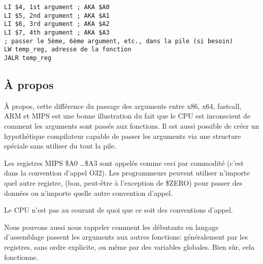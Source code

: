 \begin{lstlisting}[caption=MIPS (O32 calling convention),style=customasmMIPS]
LI $4, 1st argument ; AKA $A0
LI $5, 2nd argument ; AKA $A1
LI $6, 3rd argument ; AKA $A2
LI $7, 4th argument ; AKA $A3
; passer le 5ème, 6ème argument, etc., dans la pile (si besoin)
LW temp_reg, adresse de la fonction
JALR temp_reg
\end{lstlisting}

\subsection{À propos}

À propos, cette différence du passage des arguments entre x86, x64, fastcall, ARM
et MIPS est une bonne illustration du fait que le CPU est inconscient de comment
les arguments sont passés aux fonctions.
Il est aussi possible de créer un hypothétique compilateur capable de passer les
arguments via une structure spéciale sans utiliser du tout la pile.

Les registres MIPS \$A0 \dots \$A3 sont appelés comme ceci par commodité (c'est
dans la convention d'appel O32).
Les programmeurs peuvent utiliser n'importe quel autre registre, (bon, peut-être
à l'exception de \$ZERO) pour passer des données ou n'importe quelle autre convention d'appel.

Le \ac{CPU} n'est pas au courant de quoi que ce soit des conventions d'appel.

Nous pouvons aussi nous rappeler comment les débutants en langage d'assemblage passent
les arguments aux autres fonctions: généralement par les registres, sans ordre explicite,
ou même par des variables globales.
Bien sûr, cela fonctionne.

